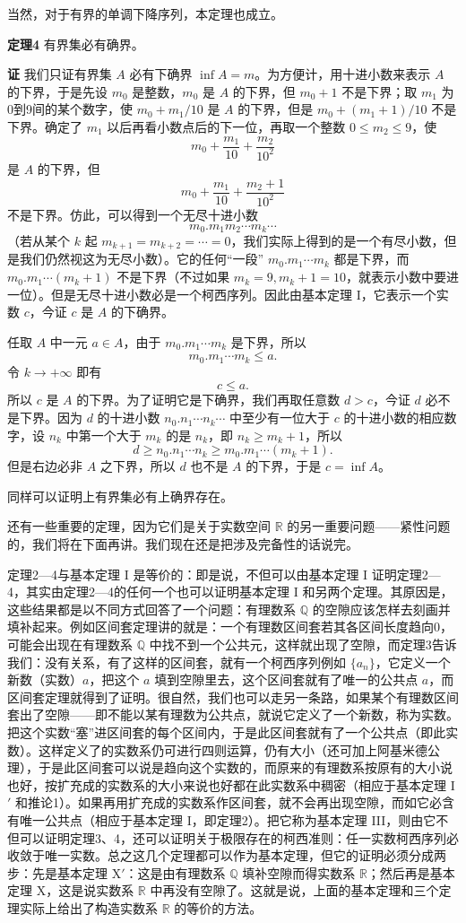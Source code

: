 当然，对于有界的单调下降序列，本定理也成立。

\noindent\textbf{定理4}\quad
有界集必有确界。

\noindent\textbf{证}\quad
我们只证有界集 $A$ 必有下确界 $\inf A=m$。为方便计，用十进小数来表示 $A$ 的下界，于是先设 $m_0$ 是整数，$m_0$ 是 $A$ 的下界，但 $m_0+1$ 不是下界；取 $m_1$ 为0到9间的某个数字，使 $m_0+m_1/10$ 是 $A$ 的下界，但是 $m_0+(m_1+1)/10$ 不是下界。确定了 $m_1$ 以后再看小数点后的下一位，再取一个整数 $0\le m_2\le9$，使
\[
 m_0+\frac{m_1}{10}+\frac{m_2}{10^2}
\]
是 $A$ 的下界，但
\[
 m_0+\frac{m_1}{10}+\frac{m_2+1}{10^2}
\]
不是下界。仿此，可以得到一个无尽十进小数
\[
 m_0.m_1m_2\cdots m_k\cdots
\]
（若从某个 $k$ 起 $m_{k+1}=m_{k+2}=\cdots=0$，我们实际上得到的是一个有尽小数，但是我们仍然视这为无尽小数）。它的任何“一段” $m_0.m_1\cdots m_k$ 都是下界，而 $m_0.m_1\cdots(m_k+1)$ 不是下界（不过如果 $m_k=9,m_k+1=10$，就表示小数中要进一位）。但是无尽十进小数必是一个柯西序列。因此由基本定理 I，它表示一个实数 $c$，今证 $c$ 是 $A$ 的下确界。

任取 $A$ 中一元 $a\in A$，由于 $m_0.m_1\cdots m_k$ 是下界，所以
\[
 m_0.m_1\cdots m_k\le a.
\]
令 $k\to+\infty$ 即有
\[
 c\le a.
\]
所以 $c$ 是 $A$ 的下界。为了证明它是下确界，我们再取任意数 $d>c$，今证 $d$ 必不是下界。因为 $d$ 的十进小数 $n_0.n_1\cdots n_k\cdots$ 中至少有一位大于 $c$ 的十进小数的相应数字，设 $n_k$ 中第一个大于 $m_k$ 的是 $n_k$，即 $n_k\ge m_k+1$，所以
\[
 d\ge n_0.n_1\cdots n_k\ge m_0.m_1\cdots(m_k+1).
\]
但是右边必非 $A$ 之下界，所以 $d$ 也不是 $A$ 的下界，于是 $c=\inf A$。

同样可以证明上有界集必有上确界存在。

还有一些重要的定理，因为它们是关于实数空间 $\mathbb R$ 的另一重要问题——紧性问题的，我们将在下面再讲。我们现在还是把涉及完备性的话说完。

定理2—4与基本定理 I 是等价的：即是说，不但可以由基本定理 I 证明定理2—4，其实由定理2—4的任何一个也可以证明基本定理 I 和另两个定理。其原因是，这些结果都是以不同方式回答了一个问题：有理数系 $\mathbb Q$ 的空隙应该怎样去刻画并填补起来。例如区间套定理讲的就是：一个有理数区间套若其各区间长度趋向0，可能会出现在有理数系 $\mathbb Q$ 中找不到一个公共元，这样就出现了空隙，而定理3告诉我们：没有关系，有了这样的区间套，就有一个柯西序列例如 $\{a_n\}$，它定义一个新数（实数）$a$，把这个 $a$ 填到空隙里去，这个区间套就有了唯一的公共点 $a$，而区间套定理就得到了证明。很自然，我们也可以走另一条路，如果某个有理数区间套出了空隙——即不能以某有理数为公共点，就说它定义了一个新数，称为实数。把这个实数“塞”进区间套的每个区间内，于是此区间套就有了一个公共点（即此实数）。这样定义了的实数系仍可进行四则运算，仍有大小（还可加上阿基米德公理），于是此区间套可以说是趋向这个实数的，而原来的有理数系按原有的大小说也好，按扩充成的实数系的大小来说也好都在此实数系中稠密（相应于基本定理 I$'$ 和推论1）。如果再用扩充成的实数系作区间套，就不会再出现空隙，而如它必含有唯一公共点（相应于基本定理 I，即定理2）。把它称为基本定理 III，则由它不但可以证明定理3、4，还可以证明关于极限存在的柯西准则：任一实数柯西序列必收敛于唯一实数。总之这几个定理都可以作为基本定理，但它的证明必须分成两步：先是基本定理 X$'$：这是由有理数系 $\mathbb Q$ 填补空隙而得实数系 $\mathbb R$；然后再是基本定理 X，这是说实数系 $\mathbb R$ 中再没有空隙了。这就是说，上面的基本定理和三个定理实际上给出了构造实数系 $\mathbb R$ 的等价的方法。

